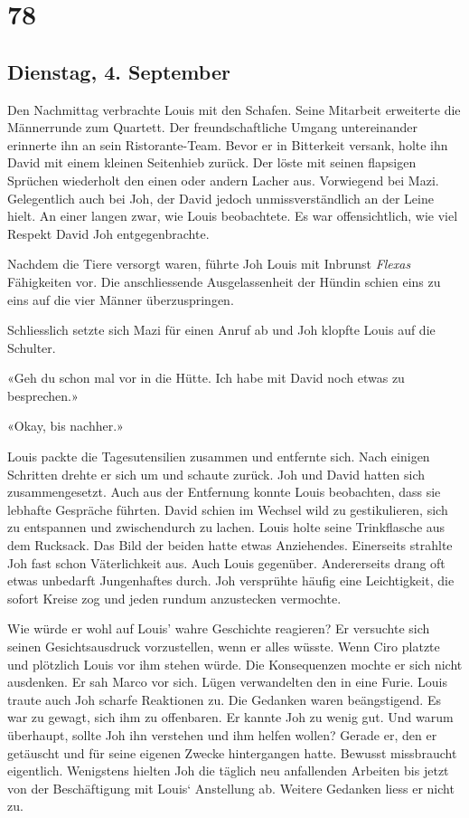 \chapter{78}

\section{Dienstag, 4. 
September}



Den Nachmittag verbrachte Louis mit den Schafen. Seine Mitarbeit
erweiterte die Männerrunde zum Quartett. Der freundschaftliche Umgang
untereinander erinnerte ihn an sein Ristorante-Team. Bevor er in
Bitterkeit versank, holte ihn David mit einem kleinen Seitenhieb zurück.
Der löste mit seinen flapsigen Sprüchen wiederholt den einen oder andern
Lacher aus. Vorwiegend bei Mazi. Gelegentlich auch bei Joh, der David
jedoch unmissverständlich an der Leine hielt. An einer langen zwar, wie
Louis beobachtete. Es war offensichtlich, wie viel Respekt David Joh
entgegenbrachte.

Nachdem die Tiere versorgt waren, führte Joh Louis mit Inbrunst \emph{Flexas} Fähigkeiten vor. 
Die anschliessende Ausgelassenheit der Hündin schien eins zu eins auf die vier Männer überzuspringen. 

Schliesslich setzte sich Mazi für einen Anruf ab und Joh klopfte Louis auf die Schulter.

«Geh du schon mal vor in die Hütte. Ich habe mit David noch etwas zu besprechen.»

«Okay, bis nachher.»

Louis packte die Tagesutensilien zusammen und entfernte sich. 
Nach einigen Schritten drehte er sich um und schaute zurück.
Joh und David hatten sich zusammengesetzt. Auch aus der Entfernung
konnte Louis beobachten, dass sie lebhafte Gespräche führten. David
schien im Wechsel wild zu gestikulieren, sich zu entspannen und
zwischendurch zu lachen. Louis holte seine Trinkflasche aus dem Rucksack. Das Bild der beiden
hatte etwas Anziehendes. Einerseits strahlte Joh fast schon
Väterlichkeit aus. Auch Louis gegenüber. Andererseits drang oft etwas
unbedarft Jungenhaftes durch. Joh versprühte häufig eine Leichtigkeit, die
sofort Kreise zog und jeden rundum anzustecken vermochte.

Wie würde er wohl auf Louis’ wahre Geschichte reagieren? Er versuchte sich
seinen Gesichtsausdruck vorzustellen, wenn er alles wüsste. Wenn Ciro
platzte und plötzlich Louis vor ihm stehen würde. Die Konsequenzen mochte er sich nicht  ausdenken. Er sah Marco
vor sich. Lügen verwandelten den in eine Furie. Louis traute auch Joh
scharfe Reaktionen zu. Die Gedanken waren beängstigend. Es war zu
gewagt, sich ihm zu offenbaren. Er kannte Joh zu wenig gut. Und warum
überhaupt, sollte Joh ihn verstehen und ihm helfen wollen? Gerade er,
den er getäuscht und für seine eigenen Zwecke hintergangen hatte.
Bewusst missbraucht eigentlich. Wenigstens hielten Joh die täglich neu anfallenden Arbeiten bis jetzt von der Beschäftigung mit Louis` Anstellung ab. Weitere Gedanken liess er nicht zu.

